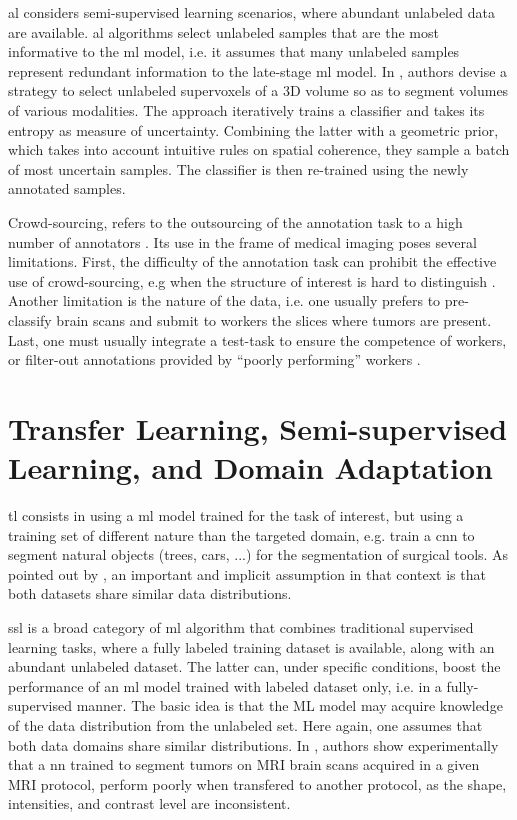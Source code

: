 \gls{al} \cite{settles09} considers semi-supervised learning scenarios, where abundant unlabeled data are available.
\gls{al} algorithms select unlabeled samples that are the most informative to the \gls{ml} model, i.e. it assumes that many unlabeled samples represent redundant information to the late-stage \gls{ml} model.
In \cite{KonSznFua15}, authors devise a strategy to select unlabeled supervoxels of a 3D volume so as to segment volumes of various modalities.
The approach iteratively trains a classifier and takes its entropy as measure of uncertainty.
Combining the latter with a geometric prior, which takes into account intuitive rules on spatial coherence, they sample a batch of most uncertain samples.
The classifier is then re-trained using the newly annotated samples.

Crowd-sourcing, refers to the outsourcing of the annotation task to a high number of annotators \cite{orting19}.
Its use in the frame of medical imaging poses several limitations.
First, the difficulty of the annotation task can prohibit the effective use of crowd-sourcing, e.g when the structure of interest is hard to distinguish \cite{orting19}.
Another limitation is the nature of the data, i.e. one usually prefers to pre-classify brain scans and submit to workers the slices where tumors are present.
Last, one must usually integrate a test-task to ensure the competence of workers, or filter-out annotations provided by ``poorly performing'' workers \cite{park18}.

\section{Transfer Learning, Semi-supervised Learning, and Domain Adaptation}
\gls{tl} consists in using a \gls{ml} model trained for the task of interest, but using a training set of different nature than the targeted domain, e.g. train a \gls{cnn} to segment natural objects (trees, cars, ...) for the segmentation of surgical tools.
As pointed out by \cite{oliver18}, an important and implicit assumption in that context is that both datasets share similar data distributions.

\gls{ssl} is a broad category of \gls{ml} algorithm that combines traditional supervised learning tasks, where a fully labeled training dataset is available, along with an abundant unlabeled dataset.
The latter can, under specific conditions, boost the performance of an \gls{ml} model trained with labeled dataset only, i.e. in a fully-supervised manner.
The basic idea is that the ML model may acquire knowledge of the data distribution from the unlabeled set.
Here again, one assumes that both data domains share similar distributions.
In \cite{ghafoorian17}, authors show experimentally that a \gls{nn} trained to segment tumors on MRI brain scans acquired in a given MRI protocol, perform poorly when transfered to another protocol, as the shape, intensities, and contrast level are inconsistent.

